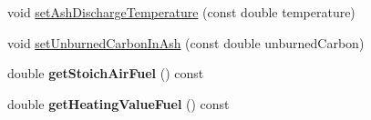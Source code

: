 \begin{DoxyCompactItemize}
\item 
void \hyperlink{class_solid_liquid_flue_gas_material_ad29543a88737c3d051c7d824287bc791}{set\+Ash\+Discharge\+Temperature} (const double temperature)
\item 
void \hyperlink{class_solid_liquid_flue_gas_material_adf052dd1bdceeab710a4986b1fd874b9}{set\+Unburned\+Carbon\+In\+Ash} (const double unburned\+Carbon)
\item 
\mbox{\label{class_solid_liquid_flue_gas_material_a0fc7264baa34c702ffbb79cfb0ec9f59}} 
double {\bfseries get\+Stoich\+Air\+Fuel} () const
\item 
\mbox{\label{class_solid_liquid_flue_gas_material_af9742946465fb1a27533ead1c0174193}} 
double {\bfseries get\+Heating\+Value\+Fuel} () const
\end{DoxyCompactItemize}
